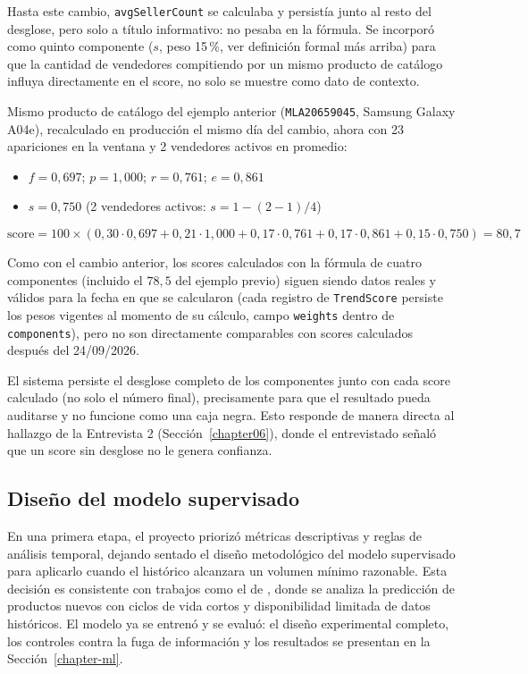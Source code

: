Hasta este cambio, \texttt{avgSellerCount} se calculaba y persistía junto al resto del desglose, pero solo a título informativo: no pesaba en la fórmula. Se incorporó como quinto componente ($s$, peso 15\,\%, ver definición formal más arriba) para que la cantidad de vendedores compitiendo por un mismo producto de catálogo influya directamente en el score, no solo se muestre como dato de contexto.

Mismo producto de catálogo del ejemplo anterior (\texttt{MLA20659045}, Samsung Galaxy A04e), recalculado en producción el mismo día del cambio, ahora con 23 apariciones en la ventana y 2 vendedores activos en promedio:

\begin{itemize}
	\item $f = 0{,}697$; $p = 1{,}000$; $r = 0{,}761$; $e = 0{,}861$
	\item $s = 0{,}750$ (2 vendedores activos: $s = 1 - (2-1)/4$)
\end{itemize}

\[
	\text{score} = 100 \times (0{,}30 \cdot 0{,}697 + 0{,}21 \cdot 1{,}000 + 0{,}17 \cdot 0{,}761 + 0{,}17 \cdot 0{,}861 + 0{,}15 \cdot 0{,}750) = 80{,}7
\]

Como con el cambio anterior, los scores calculados con la fórmula de cuatro componentes (incluido el $78{,}5$ del ejemplo previo) siguen siendo datos reales y válidos para la fecha en que se calcularon (cada registro de \texttt{TrendScore} persiste los pesos vigentes al momento de su cálculo, campo \texttt{weights} dentro de \texttt{components}), pero no son directamente comparables con scores calculados después del 24/09/2026.

El sistema persiste el desglose completo de los componentes junto con cada score calculado (no solo el número final), precisamente para que el resultado pueda auditarse y no funcione como una caja negra. Esto responde de manera directa al hallazgo de la Entrevista 2 (Sección~\ref{chapter06}), donde el entrevistado señaló que un score sin desglose no le genera confianza.

\subsection{Diseño del modelo supervisado}

En una primera etapa, el proyecto priorizó métricas descriptivas y reglas de análisis temporal, dejando sentado el diseño metodológico del modelo supervisado para aplicarlo cuando el histórico alcanzara un volumen mínimo razonable. Esta decisión es consistente con trabajos como el de \textcite{ElalemMaierSeifert2023}, donde se analiza la predicción de productos nuevos con ciclos de vida cortos y disponibilidad limitada de datos históricos. El modelo ya se entrenó y se evaluó: el diseño experimental completo, los controles contra la fuga de información y los resultados se presentan en la Sección~\ref{chapter-ml}.

